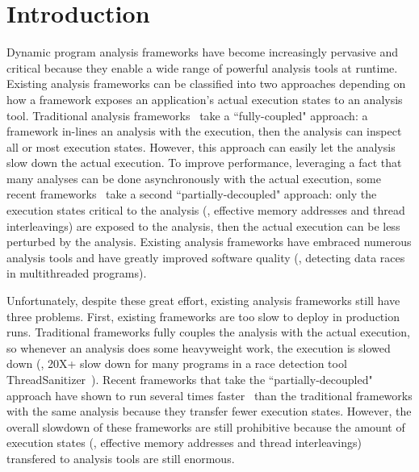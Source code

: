\section{Introduction} \label{sec:intro}



Dynamic program analysis frameworks have become increasingly pervasive and 
critical because they enable a wide range of powerful analysis tools at 
runtime. Existing analysis frameworks can be classified into two approaches 
depending on how a framework exposes an application's actual execution states 
to an analysis tool. Traditional analysis frameworks~\cite{dynamorio, 
pin:pldi05, valgrind:pldi, lift:micro06, tsan} take a ``fully-coupled" 
approach: a framework in-lines an analysis with the execution, then the 
analysis can inspect all or most execution states. However, this approach can 
easily let the analysis slow down the actual execution. To improve performance, 
leveraging a fact that many analyses can be done asynchronously with the actual 
execution, some recent frameworks~\cite{decouple:usenix08, speck:asplos08, 
shadowreplica:ccs13, 
wester:parallelizing:asplos13, superpin, jungwoo:oopsla09} take a second 
``partially-decoupled" approach: only the execution states critical to the 
analysis (\eg, effective memory addresses and thread interleavings) are exposed 
to the analysis, then the actual execution can be less perturbed by the 
analysis. Existing analysis frameworks have embraced numerous analysis tools 
and have greatly improved software quality (\eg, detecting data races in 
multithreaded programs).



Unfortunately, despite these great effort, existing analysis frameworks still 
have three problems. First, existing frameworks are too slow to deploy in 
production runs. Traditional frameworks fully couples the analysis with the 
actual execution, so whenever an analysis does some heavyweight work, the 
execution is slowed down (\eg, 20X+ slow down for many programs in a race 
detection tool ThreadSanitizer~\cite{tsan}). Recent frameworks that take the 
``partially-decoupled" approach have shown to run several times 
faster~\cite{shadowreplica:ccs13, wester:parallelizing:asplos13} than the 
traditional frameworks with the same analysis because they transfer fewer 
execution states. However, the overall slowdown of these frameworks are still 
prohibitive because the amount of execution states (\eg, effective memory 
addresses and thread interleavings) transfered to analysis tools are still 
enormous.


